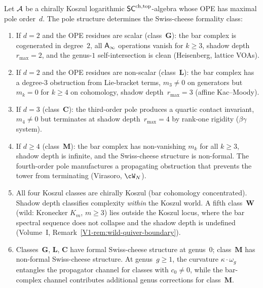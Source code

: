 \begin{theorem}
\label{thm:pole-structure-dichotomy}
Let\/ $\mathcal{A}$ be a chirally Koszul logarithmic
$\mathsf{SC}^{\mathrm{ch,top}}$-algebra whose OPE has maximal pole order\/~$d$.
The pole structure determines the Swiss-cheese formality
class:
\begin{enumerate}[label=\textup{(\roman*)}]
\item If\/ $d = 2$ and the OPE residues are scalar
 \textup{(}class~$\mathbf{G}$\textup{)}: the bar complex is
 cogenerated in degree~$2$, all $\mathsf{A}_{\infty}$ operations vanish
 for $k \ge 3$, shadow depth\/~$r_{\max} = 2$, and the
 genus-$1$ self-intersection is clean
 \textup{(}Heisenberg, lattice VOAs\textup{)}.
\item If\/ $d = 2$ and the OPE residues are non-scalar
 \textup{(}class~$\mathbf{L}$\textup{)}: the bar complex
 has a degree-$3$ obstruction from Lie-bracket terms,
 $m_3 \ne 0$ on generators but $m_k = 0$ for $k \ge 4$
 on cohomology, shadow depth\/~$r_{\max} = 3$
 \textup{(}affine Kac--Moody\textup{)}.
\item If\/ $d = 3$ \textup{(}class~$\mathbf{C}$\textup{)}:
 the third-order pole produces a quartic contact invariant,
 $m_4 \ne 0$ but terminates at
 shadow depth\/~$r_{\max} = 4$ by rank-one rigidity
 \textup{(}$\beta\gamma$ system\textup{)}.
\item If\/ $d \ge 4$ \textup{(}class~$\mathbf{M}$\textup{)}:
 the bar complex has non-vanishing $m_k$ for all $k \ge 3$,
 shadow depth is infinite, and the Swiss-cheese structure is
 non-formal. The fourth-order pole manufactures a
 propagating obstruction that prevents the tower from
 terminating
 \textup{(}Virasoro, $\cW_N$\textup{)}.
\item All four Koszul classes are chirally Koszul \textup{(}bar
 cohomology concentrated\textup{)}. Shadow depth classifies
 complexity \emph{within} the Koszul world. A fifth
 class~$\mathbf{W}$ \textup{(}wild: Kronecker $K_m$, $m \geq 3$\textup{)}
 lies outside the Koszul locus, where the bar spectral
 sequence does not collapse and the shadow depth is undefined
 \textup{(}Volume~I, Remark~\textup{\ref*{V1-rem:wild-quiver-boundary}}\textup{)}.
\item \label{item:bar-channel} Classes~$\mathbf{G}$, $\mathbf{L}$, $\mathbf{C}$ have
 formal Swiss-cheese structure at genus~$0$; class~$\mathbf{M}$
 has non-formal Swiss-cheese structure. At genus~$g \ge 1$, the
 curvature $\kappa \cdot \omega_g$ entangles the propagator
 channel for classes with $c_0 \ne 0$, while the bar-complex
 channel contributes additional genus corrections for
 class~$\mathbf{M}$.
\end{enumerate}
\end{theorem}

